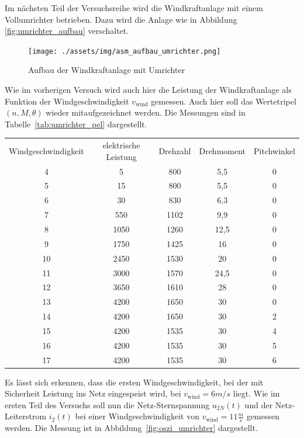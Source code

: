 \documentclass{report}
\begin{document}
Im nächsten Teil der Versuchsreihe wird die Windkraftanlage mit einem Vollumrichter betrieben. Dazu wird die Anlage wie in Abbildung \ref{fig:umrichter_aufbau} verschaltet.


\begin{figure}[!ht]
	\centering
	\texttt{[image: ./assets/img/asm\_aufbau\_umrichter.png]}
	\caption{Aufbau der Windkraftanlage mit Umrichter}
	\label{fig:aufbau_umrichter}
\end{figure}

Wie im vorherigen Versuch wird auch hier die Leistung der Windkraftanlage als Funktion der Windgeschwindigkeit $v_{\mathrm{wind}}$ gemessen. Auch hier soll das Wertetripel $(n, M, \theta)$ wieder mitaufgezeichnet werden. Die Messungen sind in Tabelle~\ref{tab:umrichter_pel} dargestellt.

\begin{table}[!ht]
	\begin{tabular}{|c|c|c|c|c|}
		Windgeschwindigkeit & elektrische Leistung & Drehzahl & Drehmoment & Pitchwinkel \\
		4                   & 5                    & 800      & 5,5        & 0           \\
		5                   & 15                   & 800      & 5,5        & 0           \\
		6                   & 30                   & 830      & 6,3        & 0           \\
		7                   & 550                  & 1102     & 9,9        & 0           \\
		8                   & 1050                 & 1260     & 12,5       & 0           \\
		9                   & 1750                 & 1425     & 16         & 0           \\
		10                  & 2450                 & 1530     & 20         & 0           \\
		11                  & 3000                 & 1570     & 24,5       & 0           \\
		12                  & 3650                 & 1610     & 28         & 0           \\
		13                  & 4200                 & 1650     & 30         & 0           \\
		14                  & 4200                 & 1650     & 30         & 2           \\
		15                  & 4200                 & 1535     & 30         & 4           \\
		16                  & 4200                 & 1535     & 30         & 5           \\
		17                  & 4200                 & 1535     & 30         & 6
	\end{tabular}
\end{table}
Es lässt sich erkennen, dass die ersten Windgeschwindigkeit, bei der mit Sicherheit Leistung ins Netz eingespeist wird, bei $v_{\mathrm{wind}} = 6m/s$ liegt.
Wie im ersten Teil des Versuchs soll nun die Netz-Sternspannung $u_{2N}(t)$ und der Netz-Leiterstrom $i_{2}(t)$ bei einer Windgeschwindigkeit von $v_{\mathrm{wind}} = 11 \frac{m}{s}$ gemessen werden. Die Messung ist in Abbildung~\ref{fig:oszi_umrichter} dargestellt.
\end{document}
